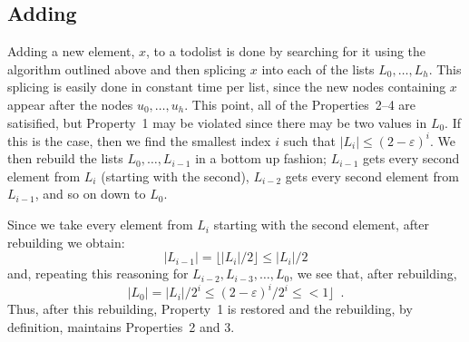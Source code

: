 \documentclass[lotsofwhite]{patmorin}
\newcommand{\eps}{\varepsilon}
\begin{document}
\vspace{1ex}
\begin{algorithmic}
    \ENDIF
  \ENDFOR
\end{algorithmic}

\subsection{Adding}

Adding a new element, $x$, to a todolist is done by searching for it
using the algorithm outlined above and then splicing $x$ into each of
the lists $L_0,\ldots,L_h$.  This splicing is easily done in constant
time per list, since the new nodes containing $x$ appear after the nodes
$u_0,\ldots,u_h$.  This point, all of the Properties~2--4 are satisified,
but Property~1 may be violated since there may be two values in $L_0$.
If this is the case, then we find the smallest index $i$ such that
$|L_i|\le (2-\eps)^i$.  We then rebuild the lists $L_{0},\ldots,L_{i-1}$
in a bottom up fashion; $L_{i-1}$ gets every second element from $L_i$
(starting with the second), $L_{i-2}$ gets every second element from
$L_{i-1}$, and so on down to $L_0$.

Since we take every element from $L_i$ starting with the second element,
after rebuilding we obtain:
\[
   |L_{i-1}| = \lfloor |L_i|/2 \rfloor \le |L_i|/2
\]
and, repeating this reasoning for $L_{i-2}, L_{i-3},\ldots, L_0$, we see that, after rebuilding,
\[
   |L_{0}| = |L_i|/2^i \le (2-\eps)^i/2^i \le < 1 \rfloor \enspace .
\]
Thus, after this rebuilding, Property~1 is restored and the rebuilding,
by definition, maintains Properties~2 and 3.
\end{document}
